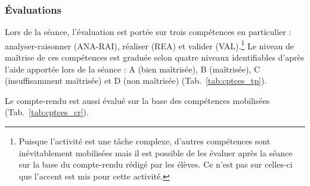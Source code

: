 \documentclass[12pt,a4paper, fleqn]{report}
\newcommand{\rea}{\colorbox{yellow_c}{\textcolor{yellow_f}{REA}}}
\newcommand{\anarai}{\colorbox{green_c}{\textcolor{green_f}{ANA-RAI}}}
\newcommand{\val}{\colorbox{orange_c}{\textcolor{orange_f}{VAL}}}
\begin{document}
\subsubsection{Évaluations}

Lors de la séance, l'évaluation est portée sur trois compétences en particulier : analyser-raisonner (\anarai{}), réaliser (\rea{}) et valider (\val{}).\footnote{Puisque l'activité est une tâche complexe, d'autres compétences sont inévitablement mobilisées mais il est possible de les évaluer après la séance sur la base du compte-rendu rédigé par les élèves.
Ce n'est pas sur celles-ci que l'accent est mis pour cette activité.}
Le niveau de maîtrise de ces compétences est graduée selon quatre niveaux identifiables d'après l'aide apportée lors de la séance : A (bien maîtrisée), B (maîtrisée), C (insuffisamment maîtrisée) et D (non maîtrisée) (Tab.~\ref{tab:cptces_tp}).

Le compte-rendu est aussi évalué sur la base des compétences mobilisées (Tab.~\ref{tab:cptces_cr}).
\end{document}
